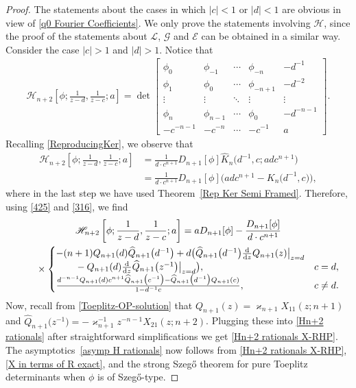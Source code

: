\documentclass[10pt,a4paper]{amsart}
\numberwithin{equation}{section}
\newcommand{\dd}{{\rm d}}
\begin{document}
		\begin{proof}
			The statements about the cases in which $|c|<1$ or $|d|<1$ are obvious in view of \eqref{q0 Fourier Coefficients}. We only prove the statements involving $\mathscr{H}$, since the proof of the statements about $\mathscr{L}$, $\mathscr{G}$ and $\mathscr{E}$ can be obtained in a similar way. Consider the case $|c|>1$ and $|d|>1$. Notice that
			\begin{gather*}
				\mathscr{H}_{n+2}\left[\phi;\frac{1}{z-d},\frac{1}{z-c};a\right] = \det \begin{bmatrix}
					\phi_0& \phi_{-1} & \cdots & \phi_{-n} & -d^{-1} \\
					\phi_{1}& \phi_0 & \cdots & \phi_{-n+1} & -d^{-2} \\
					\vdots & \vdots & \ddots & \vdots & \vdots \\
					\phi_{n} & \phi_{n-1} & \cdots & \phi_{0} & -d^{-n-1} \\
					-c^{-n-1} & -c^{-n} & \cdots & -c^{-1} & a
				\end{bmatrix}.
			\end{gather*}
			Recalling \eqref{ReproducingKer}, we observe that
			\begin{align*}
				\mathscr{H}_{n+2}\left[\phi;\frac{1}{z-d},\frac{1}{z-c};a\right] & = \frac{1}{d \cdot c^{n+1}} D_{n+1}[\phi] \widehat{K}_{n}\big(d^{-1},c;a d c^{n+1}\big) \\ & = \frac{1}{d \cdot c^{n+1}} D_{n+1}[\phi] \big( adc^{n+1} - K_{n}\big(d^{-1},c\big) \big),	
			\end{align*}
			where in the last step we have used Theorem~\ref{Rep Ker Semi Framed}. Therefore, using \eqref{425} and \eqref{316}, we find
			\begin{gather}
					\mathscr{H}_{n+2}\left[\phi;\frac{1}{z-d},\frac{1}{z-c};a\right]
= aD_{n+1}[\phi] - \frac{D_{n+1}[\phi]}{d \cdot c^{n+1}}\nonumber \\
\phantom{\qquad}{}\times \begin{cases}
						-(n+1) Q_{n+1}(d)\widehat{Q}_{n+1}\big(d^{-1}\big)+ d \big( \widehat{Q}_{n+1}\big(d^{-1}\big) \tfrac{\dd}{\dd z} Q_{n+1}(z) \big|_{z=d} & \\
\qquad{} - Q_{n+1}(d) \tfrac{\dd}{\dd z} \widehat{Q}_{n+1}\big(z^{-1}\big) \big|_{z=d} \big), & c = d, \\
						 \tfrac{d^{-n-1}Q_{n+1}(d)c^{n+1}\widehat{Q}_{n+1}\big(c^{-1}\big) - \widehat{Q}_{n+1}\big(d^{-1}\big) Q_{n+1}(c)}{1-d^{-1}c}, & c \neq d.
					\end{cases}\label{Hn+2 rationals}
\end{gather}
Now, recall from \eqref{Toeplitz-OP-solution} that $Q_{n+1}(z)=\varkappa_{n+1} X_{11}(z;n+1)$ and $\widehat{Q}_{n+1}\big(z^{-1}\big) = - \varkappa^{-1}_{n+1} z^{-n-1} X_{21}(z;\allowbreak n+2)$.
 Plugging these into \eqref{Hn+2 rationals} after straightforward simplifications we get \eqref{Hn+2 rationals X-RHP}. The asymptotics~\eqref{asymp H rationals} now follows from \eqref{Hn+2 rationals X-RHP}, \eqref{X in terms of R exact}, and the strong Szeg\H{o} theorem for pure Toeplitz determinants when $\phi$ is of Szeg\H{o}-type.
		\end{proof}
\end{document}
